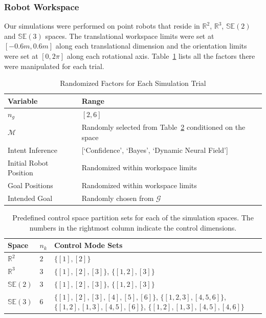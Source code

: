\documentclass[letterpaper, 10 pt, conference]{ieeeconf}  %
\begin{document}
\subsubsection{Robot Workspace}
Our simulations were performed on point robots that reside in $\mathbb{R}^2$, $\mathbb{R}^3$, $\mathbb{SE}(2)$ and $\mathbb{SE}(3)$ spaces. The translational workspace limits were set at $[-0.6m, 0.6m]$ along each translational dimension and the orientation limits were set at $[0, 2\pi]$ along each rotational axis. Table~\ref{tbl:manip} lists all the factors there were manipulated for each trial. 
\begin{table}[h]
	\centering
	\begin{tabular}{|p{3cm}|p{3cm}|}
		\hline
		\textbf{Variable} &\textbf{Range}  \\ \hline
		$n_g$ &  $[2,6]$ \\ \hline
		$\mathcal{M}$ & Randomly selected from Table~\ref{tbl:cmp} conditioned on the space\\ \hline
		Intent Inference & [`Confidence', `Bayes', `Dynamic Neural Field'] \\ \hline
		Initial Robot Position & Randomized within workspace limits \\ \hline
		Goal Positions & Randomized within workspace limits \\ \hline
		Intended Goal & Randomly chosen from $\mathcal{G}$ \\ \hline
	\end{tabular}
	\vspace{.2cm}
	\caption{Randomized Factors for Each Simulation Trial} 
	\label{tbl:manip}
\end{table}
\begin{table}[h]
	\centering
	\begin{tabular}{|p{1cm}|p{0.5cm}|p{3cm}|}
		\hline
		\textbf{Space} & $n_k$ &\textbf{Control Mode Sets}  \\ \hline
		$\mathbb{R}^2$ & $2$ & $\{[1],[2]\}$ \\ \hline
		$\mathbb{R}^3$ & $3$ & $\{[1],[2], [3]\}$, $\{[1,2], [3]\}$ \\ \hline
		$\mathbb{SE}(2)$ & $3$ &  $\{[1],[2],[3]\}$, $\{[1,2], [3]\}$ \\ \hline
		$\mathbb{SE}(3)$ & $6$ & $\{[1],[2],[3],[4],[5],[6]\}$, $\{[1,2,3],  [4,5,6]\}$, $\{[1,2], [1,3], [4,5], [6]\}$, $\{[1,2], [1,3], [4,5], [4,6]\}$ \\ \hline
	\end{tabular}
	\vspace{.2cm}
	\caption{Predefined control space partition sets for each of the simulation spaces. The numbers in the rightmost column indicate the control dimensions. } 
	\label{tbl:cmp}
\end{table}
\end{document}
